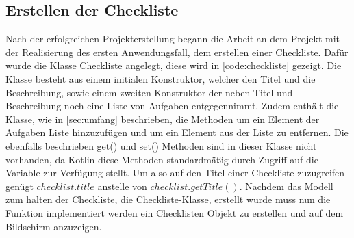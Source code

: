 \subsection{Erstellen der Checkliste}\label{subsec:erstelleChecklisten}

Nach der erfolgreichen Projekterstellung begann die Arbeit an dem Projekt mit der Realisierung des ersten Anwendungsfall, dem erstellen einer Checkliste. Dafür wurde die Klasse Checkliste angelegt, diese wird in \autoref{code:checkliste} gezeigt. Die Klasse besteht aus einem initialen Konstruktor, welcher den Titel und die Beschreibung, sowie einem zweiten Konstruktor der neben Titel und Beschreibung noch eine Liste von Aufgaben entgegennimmt. Zudem enthält die Klasse, wie in \autoref{sec:umfang} beschrieben, die Methoden um ein Element der Aufgaben Liste hinzuzufügen und um ein Element aus der Liste zu entfernen. Die ebenfalls beschrieben get() und set() Methoden sind in dieser Klasse nicht vorhanden, da Kotlin diese Methoden standardmäßig durch Zugriff auf die Variable zur Verfügung stellt. Um also auf den Titel einer Checkliste zuzugreifen genügt $checklist.title$ anstelle von $checklist.getTitle()$. Nachdem das Modell zum halten der Checkliste, die Checkliste-Klasse, erstellt wurde muss nun die Funktion implementiert werden ein Checklisten Objekt zu erstellen und auf dem Bildschirm anzuzeigen.
\\


